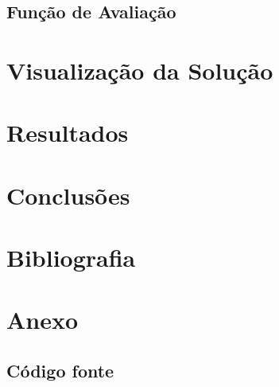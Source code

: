 \documentclass[runningheads,a4paper]{llncs}
\begin{document}
\subsection{Função de Avaliação}


\section{Visualização da Solução}


\section{Resultados}

\section{Conclusões}

\section*{Bibliografia}

\section*{Anexo}

\subsection*{Código fonte}

\newenvironment{changemargin}[2]{%
\begin{list}{}{%
\setlength{\topsep}{0pt}%
\setlength{\leftmargin}{#1}%
\setlength{\rightmargin}{#2}%
\setlength{\listparindent}{\parindent}%
\setlength{\itemindent}{\parindent}%
\setlength{\parsep}{\parskip}%
}%
\item[]}{
\end{list}}

\medskip
\end{document}
